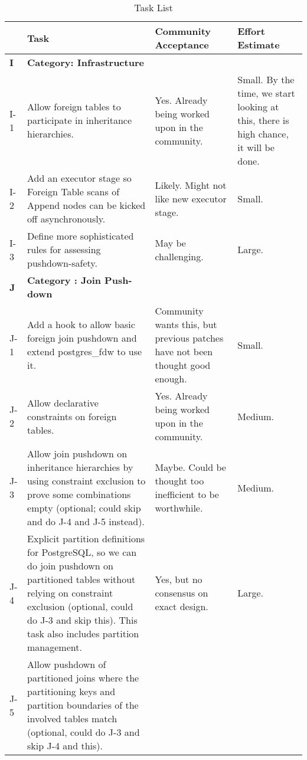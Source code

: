 	\begin{longtable}{lp{0.5\hsize}p{0.2\hsize}p{0.2\hsize}}
		\caption{\label{Tab:TaskList}Task List} \\ \hline
		&Task & Community Acceptance & Effort Estimate \\ \hline
		\endfirsthead
		\textbf{I} & \textbf{Category: Infrastructure} & & \\ \hline
		I-1 & \raggedright
			  Allow foreign tables to participate in inheritance hierarchies.
			& \raggedright Yes. Already being worked upon in the community.
			& Small. By the time, we start looking at this, there is high chance,
			  it will be done.\\
		I-2 & \raggedright
			  Add an executor stage so Foreign Table scans of Append nodes can be
			  kicked off asynchronously.
			& \raggedright Likely.  Might not like new executor stage.
			& Small.\\
		I-3 & \raggedright
			  Define more sophisticated rules for assessing pushdown-safety. 
			& \raggedright May be challenging.
			& Large.\\ \hline
		\textbf{J} & \textbf{Category : Join Push-down} & & \\ \hline
		J-1 & \raggedright
			  Add a hook to allow basic foreign join pushdown and extend
			  postgres\_fdw to use it.
			& \raggedright Community wants this, but previous patches have not been thought good enough.
			& Small.\\
		J-2 & \raggedright
			  Allow declarative constraints on foreign tables.
			& \raggedright Yes. Already being worked upon in the community.
			& Medium.\\
		J-3 & \raggedright
			  Allow join pushdown on inheritance hierarchies by using constraint
			  exclusion to prove some combinations empty (optional; could skip and
			  do J-4 and J-5 instead). 
			& \raggedright Maybe.  Could be thought too inefficient to be worthwhile.
			& Medium. \\
		J-4 & \raggedright
			  Explicit partition definitions for PostgreSQL, so we can do join
			  pushdown on partitioned tables without relying on constraint exclusion
			  (optional, could do J-3 and skip this).
			  This task also includes partition management.
			& \raggedright Yes, but no consensus on exact design.
			& Large. \\
		J-5 & \raggedright
			  Allow pushdown of partitioned joins where the partitioning keys and
			  partition boundaries of the involved tables match (optional, could do
			  J-3 and skip J-4 and this).

\end{longtable}
